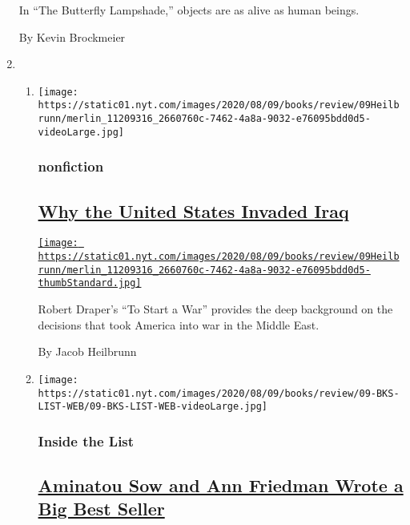 \begin{enumerate}
  In ``The Butterfly Lampshade,'' objects are as alive as human beings.

  By Kevin Brockmeier
\item
  \begin{enumerate}
  \def\labelenumii{\arabic{enumii}.}
  \item
    \texttt{[image: https://static01.nyt.com/images/2020/08/09/books/review/09Heilbrunn/merlin\_11209316\_2660760c-7462-4a8a-9032-e76095bdd0d5-videoLarge.jpg]}

    \hypertarget{nonfiction-1}{%
    \subsubsection{nonfiction}\label{nonfiction-1}}

    \hypertarget{why-the-united-states-invaded-iraq}{%
    \subsection{\texorpdfstring{\href{/2020/07/28/books/review/to-start-a-war-robert-draper.html}{Why
    the United States Invaded
    Iraq}}{Why the United States Invaded Iraq}}\label{why-the-united-states-invaded-iraq}}

    \href{/2020/07/28/books/review/to-start-a-war-robert-draper.html}{\texttt{[image: https://static01.nyt.com/images/2020/08/09/books/review/09Heilbrunn/merlin\_11209316\_2660760c-7462-4a8a-9032-e76095bdd0d5-thumbStandard.jpg]}}

    Robert Draper's ``To Start a War'' provides the deep background on
    the decisions that took America into war in the Middle East.

    By Jacob Heilbrunn
  \item
    \texttt{[image: https://static01.nyt.com/images/2020/08/09/books/review/09-BKS-LIST-WEB/09-BKS-LIST-WEB-videoLarge.jpg]}

    \hypertarget{inside-the-list}{%
    \subsubsection{Inside the List}\label{inside-the-list}}

    \hypertarget{aminatou-sow-and-ann-friedman-wrote-a-big-best-seller}{%
    \subsection{\texorpdfstring{\href{/2020/07/30/books/review/aminatou-sow-ann-friedman-big-friendship.html}{Aminatou
    Sow and Ann Friedman Wrote a Big Best
    Seller}}{Aminatou Sow and Ann Friedman Wrote a Big Best Seller}}\label{aminatou-sow-and-ann-friedman-wrote-a-big-best-seller}}


\end{enumerate}
\end{enumerate}
